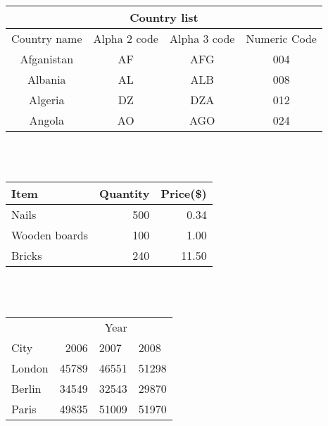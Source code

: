 \documentclass[a4paper,12pt]{report}
\begin{document}
\begin{tabular}{|c|c|c|c|}
\hline
\multicolumn{4}{|c|}{Country list} \\
\hline
Country name & Alpha 2 code& Alpha 3 code& Numeric Code\\
\hline
Afganistan & AF & AFG & 004\\
Albania & AL & ALB & 008\\
Algeria & DZ & DZA &012\\
Angola & AO & AGO & 024\\
\hline
\end{tabular}
\\
\\

\begin{tabular}{l|r|r}


Item &Quantity &Price(\$)  \\
\hline
Nails & 500 & 0.34 \\
Wooden boards & 100 & 1.00 \\
Bricks & 240 & 11.50\\
\end{tabular}
\\
\\

\begin{tabular}{l|rll}
\multicolumn{3}{r}{Year} \\
\cline{2-4}
City & 2006 & 2007 &2008\\
\hline
London & 45789 & 46551 & 51298\\
Berlin &34549 & 32543 & 29870\\
Paris & 49835 & 51009 & 51970\\
\end{tabular}
\end{document}
